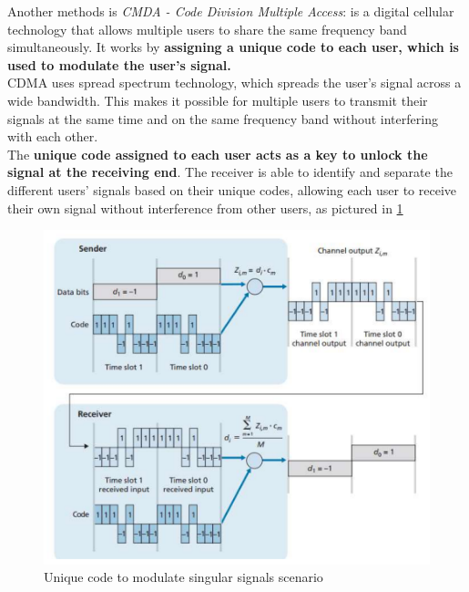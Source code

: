 \documentclass[10pt,a4paper]{report}
\theoremstyle{definition}
\begin{document}
Another methods is \textit{CMDA - Code Division Multiple Access}: is a digital cellular technology that allows multiple users to share the same frequency band simultaneously. It works by \textbf{assigning a unique code to each user, which is used to modulate the user's signal.}\\
CDMA uses spread spectrum technology, which spreads the user's signal across a wide bandwidth. This makes it possible for multiple users to transmit their signals at the same time and on the same frequency band without interfering with each other.\\
The \textbf{unique code assigned to each user acts as a key to unlock the signal at the receiving end}. The receiver is able to identify and separate the different users' signals based on their unique codes, allowing each user to receive their own signal without interference from other users, as pictured in \ref{coded-signals}
\begin{figure}[h!]
	\centering\includegraphics[scale=0.70]{images/Pasted image 20230301173902.png}
	\caption{Unique code to modulate singular signals scenario}
	\label{coded-signals}
\end{figure}
\end{document}
